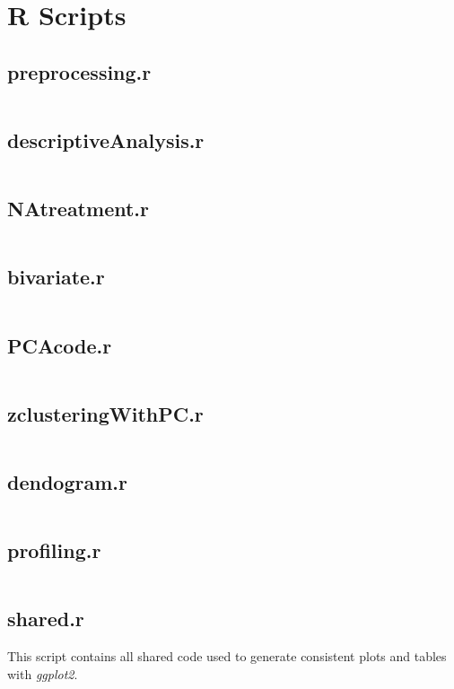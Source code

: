 

\section{R Scripts}%
\label{sec:r_scripts}

\newcommand{\mintedfile}[2]{
    \subsection{#1}%
    \label{sub:#1}
    #2
    \inputminted{r}{../../analysis/#1}
    \pagebreak
}


\mintedfile{preprocessing.r}{}
\mintedfile{descriptiveAnalysis.r}{}
\mintedfile{NAtreatment.r}{}
\mintedfile{bivariate.r}{}
\mintedfile{PCAcode.r}{}
\mintedfile{zclusteringWithPC.r}{}
\mintedfile{dendogram.r}{}
\mintedfile{profiling.r}{}
\mintedfile{shared.r}{
    This script contains all shared code used to generate consistent plots and tables
    with \emph{ggplot2}.
}
